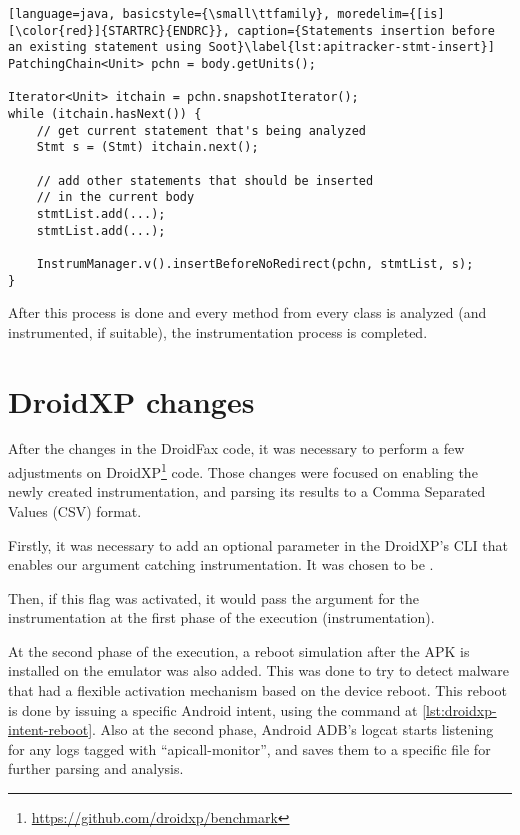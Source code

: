 \begin{lstlisting}[language=java, basicstyle={\small\ttfamily}, moredelim={[is][\color{red}]{STARTRC}{ENDRC}}, caption={Statements insertion before an existing statement using Soot}\label{lst:apitracker-stmt-insert}]
PatchingChain<Unit> pchn = body.getUnits();
				
Iterator<Unit> itchain = pchn.snapshotIterator();    
while (itchain.hasNext()) {
    // get current statement that's being analyzed
    Stmt s = (Stmt) itchain.next();

    // add other statements that should be inserted
    // in the current body
    stmtList.add(...);
    stmtList.add(...);
    
    InstrumManager.v().insertBeforeNoRedirect(pchn, stmtList, s);
}
\end{lstlisting}



After this process is done and every method from every class is analyzed (and instrumented, if suitable), the instrumentation process is completed.

\section{DroidXP changes}

After the changes in the DroidFax code, it was necessary to perform a few adjustments on DroidXP\footnote{\url{https://github.com/droidxp/benchmark}} code. Those changes were focused on enabling the newly created instrumentation, and parsing its results to a Comma Separated Values (CSV) format.

Firstly, it was necessary to add an optional parameter in the DroidXP's CLI that enables our argument catching instrumentation. It was chosen to be .

Then, if this flag was activated, it would pass the  argument for the instrumentation at the first phase of the execution (instrumentation). 

At the second phase of the execution, a reboot simulation after the APK is installed on the emulator was also added. This was done to try to detect malware that had a flexible activation mechanism based on the device reboot. This reboot is done by issuing a specific Android intent, using the command at \ref{lst:droidxp-intent-reboot}. Also at the second phase, Android ADB's logcat\cite{noauthor_logcat_2023} starts listening for any logs tagged with ``apicall-monitor'', and saves them to a specific file for further parsing and analysis.

